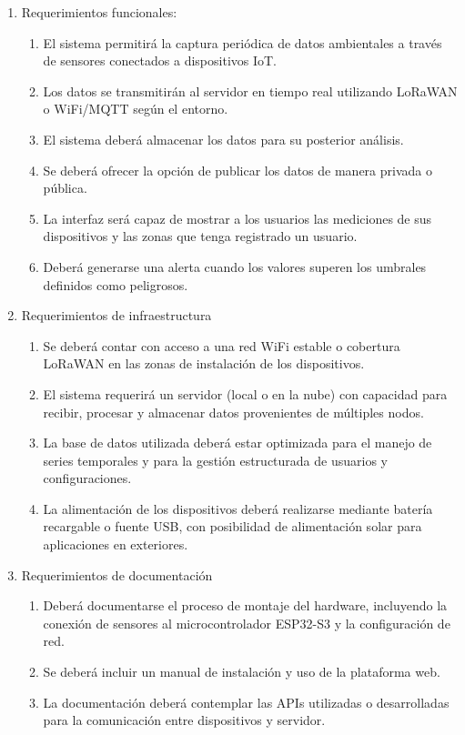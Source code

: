 \documentclass[
11pt, %
]{charter}
\begin{document}
\begin{enumerate}

	\item Requerimientos funcionales:
	\begin{enumerate}
	

		\item El sistema permitirá la captura periódica de datos ambientales a través de sensores conectados a dispositivos IoT.
		\item Los datos se transmitirán al servidor en tiempo real utilizando LoRaWAN o WiFi/MQTT según el entorno.
		\item El sistema deberá almacenar los datos para su posterior análisis.
		\item Se deberá ofrecer la opción de publicar los datos de manera privada o pública.
		\item La interfaz será capaz de mostrar a los usuarios las mediciones de sus dispositivos y las zonas que tenga registrado un usuario.
		\item Deberá generarse una alerta cuando los valores superen los umbrales definidos como peligrosos.
	\end{enumerate}
	
	\item Requerimientos de infraestructura
	\begin{enumerate}
		\item Se deberá contar con acceso a una red WiFi estable o cobertura LoRaWAN en las zonas de instalación de los dispositivos.
		\item El sistema requerirá un servidor (local o en la nube) con capacidad para recibir, procesar y almacenar datos provenientes de múltiples nodos.
		\item La base de datos utilizada deberá estar optimizada para el manejo de series temporales y para la gestión estructurada de usuarios y configuraciones.
		\item La alimentación de los dispositivos deberá realizarse mediante batería recargable o fuente USB, con posibilidad de alimentación solar para aplicaciones en exteriores.	
	\end{enumerate}
	
	\item Requerimientos de documentación
	\begin{enumerate}
		\item Deberá documentarse el proceso de montaje del hardware, incluyendo la conexión de sensores al microcontrolador ESP32-S3 y la configuración de red.
		\item Se deberá incluir un manual de instalación y uso de la plataforma web.
		\item La documentación deberá contemplar las APIs utilizadas o desarrolladas para la comunicación entre dispositivos y servidor.	
	\end{enumerate}


\end{enumerate}
\end{document}
